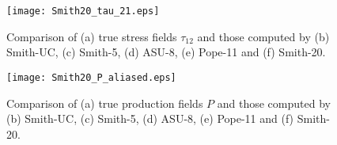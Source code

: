 




%
\begin{figure}
\centering \hspace{-1.0cm}
	\begin{center} \hspace{1.75cm}
	\texttt{[image: Smith20\_tau\_21.eps]}
	\caption{Comparison of (a) true stress fields $\tau_{12}$ and those computed by (b) Smith-UC, (c) Smith-5, (d) ASU-8, (e) Pope-11 and (f) Smith-20.}
	\label{F:Smith20_tau}
	\end{center}
\end{figure}
%
%



%
\begin{figure}
	\begin{center} \hspace{1.75cm}
	\texttt{[image: Smith20\_P\_aliased.eps]}
	\caption{Comparison of (a) true production fields $P$ and those computed by (b) Smith-UC, (c) Smith-5, (d) ASU-8, (e) Pope-11 and (f) Smith-20.}
	\label{F:Smith20_P}
	\end{center}
\end{figure}
%
%





